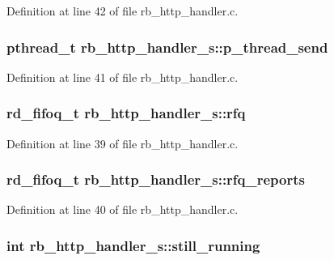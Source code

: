 Definition at line 42 of file rb\-\_\-http\-\_\-handler.\-c.

\hypertarget{structrb__http__handler__s_ae969c34a0421fe32951cb31802735f13}{
\subsubsection[{p\-\_\-thread\-\_\-send}]{\setlength{\rightskip}{0pt plus 5cm}pthread\-\_\-t rb\-\_\-http\-\_\-handler\-\_\-s\-::p\-\_\-thread\-\_\-send}}\label{structrb__http__handler__s_ae969c34a0421fe32951cb31802735f13}


Definition at line 41 of file rb\-\_\-http\-\_\-handler.\-c.

\hypertarget{structrb__http__handler__s_a39160211aefb64ec052138229da98632}{
\subsubsection[{rfq}]{\setlength{\rightskip}{0pt plus 5cm}rd\-\_\-fifoq\-\_\-t rb\-\_\-http\-\_\-handler\-\_\-s\-::rfq}}\label{structrb__http__handler__s_a39160211aefb64ec052138229da98632}


Definition at line 39 of file rb\-\_\-http\-\_\-handler.\-c.

\hypertarget{structrb__http__handler__s_a383f2047cfcdd9fe49d0deacf770a73c}{
\subsubsection[{rfq\-\_\-reports}]{\setlength{\rightskip}{0pt plus 5cm}rd\-\_\-fifoq\-\_\-t rb\-\_\-http\-\_\-handler\-\_\-s\-::rfq\-\_\-reports}}\label{structrb__http__handler__s_a383f2047cfcdd9fe49d0deacf770a73c}


Definition at line 40 of file rb\-\_\-http\-\_\-handler.\-c.

\hypertarget{structrb__http__handler__s_aa49e97bedda03106912088dad0b75e64}{
\subsubsection[{still\-\_\-running}]{\setlength{\rightskip}{0pt plus 5cm}int rb\-\_\-http\-\_\-handler\-\_\-s\-::still\-\_\-running}}\label{structrb__http__handler__s_aa49e97bedda03106912088dad0b75e64}


